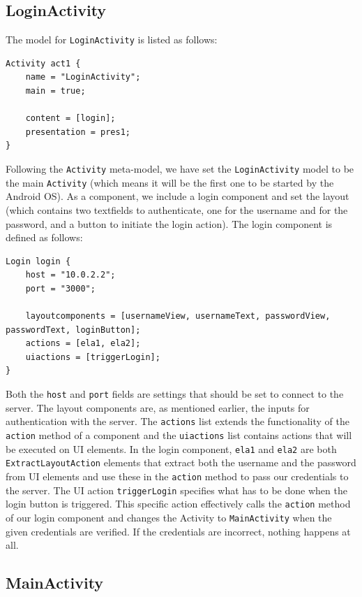 \subsection{LoginActivity}

The model for \texttt{LoginActivity} is listed as follows:

\begin{lstlisting}[label=login-model,caption=LoginActivity model, captionpos=t]
Activity act1 {
	name = "LoginActivity";
	main = true;

	content = [login];
	presentation = pres1;
}
\end{lstlisting}
Following the \texttt{Activity} meta-model, we have set the \texttt{LoginActivity} model to be the main \texttt{Activity} (which means it will be the first one to be started by the Android OS). As a component, we include a login component and set the layout (which contains two textfields to authenticate, one for the username and for the password, and a button to initiate the login action). The login component is defined as follows:

\begin{lstlisting}[label=logincomponent-model,caption=Login component model, captionpos=t]
Login login {
	host = "10.0.2.2";
	port = "3000";

	layoutcomponents = [usernameView, usernameText, passwordView, passwordText, loginButton];
	actions = [ela1, ela2];
	uiactions = [triggerLogin];
}
\end{lstlisting}
Both the \texttt{host} and \texttt{port} fields are settings that should be set to connect to the server. The layout components are, as mentioned earlier, the inputs for authentication with the server. The \texttt{actions} list  extends the functionality of the \texttt{action} method of a component and the \texttt{uiactions} list contains actions that will be executed on UI elements. In the login component, \texttt{ela1} and \texttt{ela2} are both \texttt{ExtractLayoutAction} elements that extract both the username and the password from UI elements and use these in the \texttt{action} method to pass our credentials to the server. The UI action \texttt{triggerLogin} specifies what has to be done when the login button is triggered. This specific action effectively calls the \texttt{action} method of our login component and changes the Activity to \texttt{MainActivity} when the given credentials are verified. If the credentials are incorrect, nothing happens at all.

\subsection{MainActivity}

